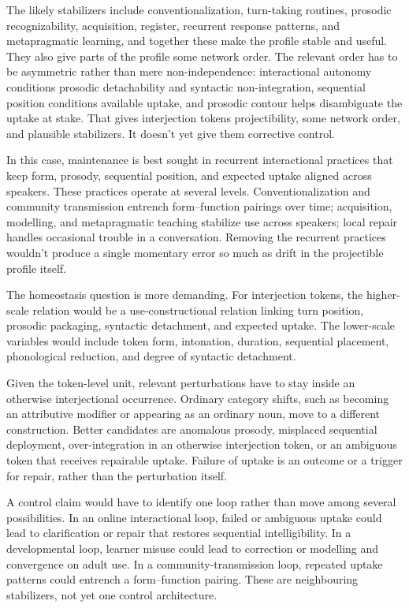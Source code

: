\documentclass[12pt]{article}
\begin{document}
The likely stabilizers include conventionalization, turn-taking routines, prosodic
recognizability, acquisition, register, recurrent response patterns, and
metapragmatic learning, and together these make the profile stable and useful. They
also give parts of the profile some network order. The relevant order has to be
asymmetric rather than mere non-independence: interactional autonomy conditions
prosodic detachability and syntactic non-integration, sequential position
conditions available uptake, and prosodic contour helps disambiguate the uptake at
stake. That gives interjection tokens projectibility, some network order, and
plausible stabilizers. It doesn't yet give them corrective control.

In this case, maintenance is best sought in recurrent interactional practices that
keep form, prosody, sequential position, and expected uptake aligned across
speakers. These practices operate at several levels. Conventionalization and
community transmission entrench form--function pairings over time; acquisition,
modelling, and metapragmatic teaching stabilize use across speakers; local repair
handles occasional trouble in a conversation. Removing the recurrent practices
wouldn't produce a single momentary error so much as drift in the projectible
profile itself.

The homeostasis question is more demanding. For interjection tokens, the
higher-scale relation would be a use-constructional relation linking turn
position, prosodic packaging, syntactic detachment, and expected uptake. The
lower-scale variables would include token form, intonation, duration, sequential
placement, phonological reduction, and degree of syntactic detachment.

Given the token-level unit, relevant perturbations have to stay inside an
otherwise interjectional occurrence. Ordinary category shifts, such as
 becoming an attributive modifier or  appearing as an
ordinary noun, move to a different construction. Better candidates are anomalous
prosody, misplaced sequential deployment, over-integration in an otherwise
interjection token, or an ambiguous token that receives repairable uptake. Failure
of uptake is an outcome or a trigger for repair, rather than the perturbation
itself.

A control claim would have to identify one loop rather than move among several
possibilities. In an online interactional loop, failed or ambiguous uptake could
lead to clarification or repair that restores sequential intelligibility. In a
developmental loop, learner misuse could lead to correction or modelling and
convergence on adult use. In a community-transmission loop, repeated uptake
patterns could entrench a form--function pairing. These are neighbouring
stabilizers, not yet one control architecture.
\end{document}
